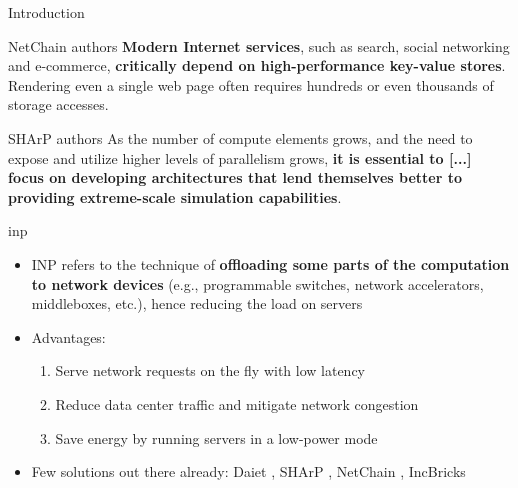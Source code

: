 \begin{frame}[fragile]{Introduction}

    \vspace{5mm}

    \begin{aquote}{NetChain \cite{netchain} authors}
        \textbf{Modern Internet services}, such as search, social networking and e-commerce, \textbf{critically depend on high-performance key-value stores}. Rendering even a single web page often requires hundreds or even thousands of storage accesses.
    \end{aquote}

    \vspace{7mm}

    \begin{aquote}{SHArP \cite{sharp} authors}
        As the number of compute elements grows, and the need to expose and utilize higher levels of parallelism grows, \textbf{it is essential to [...] focus on developing architectures that lend themselves better to providing extreme-scale simulation capabilities}.
    \end{aquote}
\end{frame}

\begin{frame}[fragile]{\gls*{inp}}
    \begin{itemize}
        \item INP refers to the technique of \textbf{offloading some parts of the computation to network devices} (e.g., programmable switches, network accelerators, middleboxes, etc.), hence reducing the load on servers
        \item Advantages:
        \begin{enumerate} %
            \item Serve network requests on the fly with low latency
            \item Reduce data center traffic and mitigate network congestion
            \item Save energy by running servers in a low-power mode
        \end{enumerate}
        \item Few solutions out there already: Daiet \cite{daiet}, SHArP \cite{sharp}, NetChain \cite{netchain}, IncBricks \cite{incbricks}
    \end{itemize}
\end{frame}


